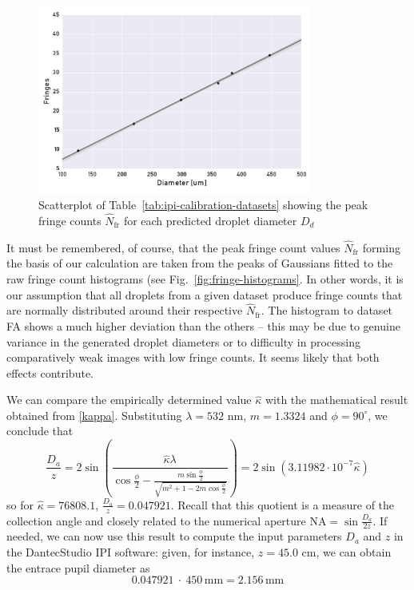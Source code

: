 \documentclass[11.5pt,oneside]{book}
\newcommand*{\figref}[1]{Fig.~\ref{#1}}
\newcommand*{\tableref}[1]{Table~\ref{#1}}
\begin{document}
\begin{figure}[ht!]
    \centering
    \includegraphics[width=0.8\textwidth]{img/fringe_regression.pdf}
    \caption{Scatterplot of \tableref{tab:ipi-calibration-datasets} showing the peak fringe counts $\hat{N}_\text{fr}$ for each predicted droplet diameter $D_d$}
    \label{fig:fringe-regression}
\end{figure}
It must be remembered, of course, that the peak fringe count values
$\hat{N}_\text{fr}$ forming the basis of our calculation are taken from the
peaks of Gaussians fitted to the raw fringe count histograms (see
\figref{fig:fringe-histograms}. In other words, it is our assumption that all
droplets from a given dataset produce fringe counts that are normally
distributed around their respective $\hat{N}_\text{fr}$. The histogram to
dataset FA shows a much higher deviation than the others -- this may be due to
genuine variance in the generated droplet diameters or to difficulty in
processing comparatively weak images with low fringe counts. It seems likely
that both effects contribute.

We can compare the empirically determined value $\hat{\kappa}$ with the
mathematical result obtained from \eqref{kappa}. Substituting $\lambda = 532$
nm, $m = 1.3324$ and $\phi = 90^\circ$, we conclude that
\begin{equation}
    \frac{D_a}{z} = 2 \sin \left( \frac{\hat{\kappa} \lambda}{\cos
    \frac{\phi}{2} - \frac{ m \sin \frac{\phi}{2}}{\sqrt{m^2 + 1 - 2m \cos
    \frac{\phi}{2}}}} \right) = 2\sin (3.11982 \cdot 10^{-7} \hat{\kappa})
\end{equation}
so for $\hat{\kappa} = 76808.1$, $\frac{D_a}{z} = 0.047921$. Recall that this
quotient is a measure of the collection angle and closely related to the
numerical aperture NA$=\sin \frac{D_a}{2z}$. If needed, we can now use this
result to compute the input parameters $D_a$ and $z$ in the DantecStudio IPI
software: given, for instance, $z = 45.0$ cm, we can obtain the entrace pupil
diameter as
\begin{equation}
    0.047921~\cdot~450\,\mathrm{mm} = 2.156\,\mathrm{mm}
\end{equation}
\end{document}
